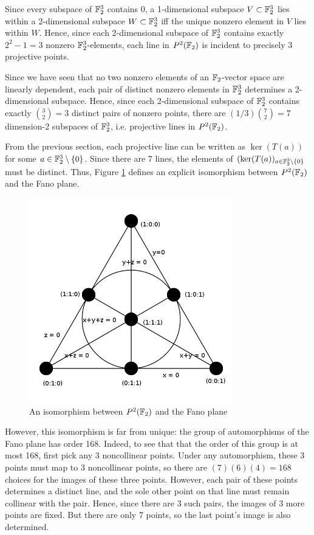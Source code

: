 \documentclass{article}
\begin{document}
Since every subspace of $\mathbb{F}_2^3$ contains 0, a 1-dimensional subspace $V \subset \mathbb{F}_2^3$ lies within a 2-dimensional subspace $W \subset \mathbb{F}_2^3$ iff the unique nonzero element in $V$ lies within $W$. Hence, since each 2-dimensional subspace of $\mathbb{F}_2^3$ contains exactly $2^2 - 1 = 3$ nonzero $\mathbb{F}_2^3$-elements, each line in $P^2(\mathbb{F}_2)$ is incident to precisely 3 projective points.

Since we have seen that no two nonzero elements of an $\mathbb{F}_2$-vector space are linearly dependent, each pair of distinct nonzero elements in $\mathbb{F}_2^3$ determines a 2-dimensional subspace. Hence, since each 2-dimensional subspace of $\mathbb{F}_2^3$ contains exactly ${3 \choose 2} = 3$ distinct pairs of nonzero points, there are
$(1/3) {7 \choose 2} = 7$ dimension-2 subspaces of $\mathbb{F}_2^3$, i.e. projective lines in $P^2(\mathbb{F}_2)$.

From the previous section, each projective line can be written as $\ker(T(a))$ for some $a \in \mathbb{F}_2^3 \setminus\{0\}$.  Since there are 7 lines, the elements of $(\ker(T(a))_{a \in \mathbb{F}_2^3 \setminus\{0\}}$ must be distinct.  Thus, Figure \ref{fano} defines an explicit isomorphism between $P^2(\mathbb{F}_2)$ and the Fano plane.


\begin{figure}[h]
\centering
\includegraphics[width=3.5in]{Fano_plane.png}
\caption{An isomorphism between $P^2(\mathbb{F}_2)$ and the Fano plane}
\label{fano}
\end{figure}

However, this isomorphism is far from unique: the group of automorphisms of the Fano plane has order 168. Indeed, to see that that the order of this group is at most 168, first pick any 3 noncollinear points.  Under any automorphism, these 3 points must map to 3 noncollinear points, so there are $(7)(6)(4) = 168$ choices for the images of these three points. However, each pair of these points determines a distinct line, and the sole other point on that line must remain collinear with the pair.  Hence, since there are 3 such pairs, the images of 3 more points are fixed.  But there are only 7 points, so the last point's image is also determined.
\end{document}
